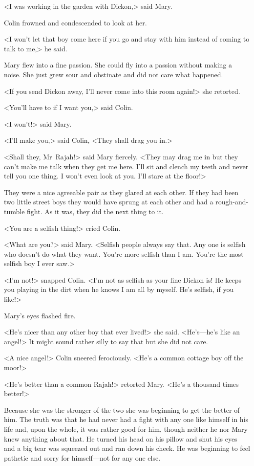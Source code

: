 <I was working in the garden with Dickon,> said Mary.

Colin frowned and condescended to look at her.

<I won't let that boy come here if you go and stay with him instead of coming to talk to me,> he said.

Mary flew into a fine passion. She could fly into a passion without making a noise. She just grew sour and obstinate and did not care what happened.

<If you send Dickon away, I'll never come into this room again!> she retorted.

<You'll have to if I want you,> said Colin.

<I won't!> said Mary.

<I'll make you,> said Colin, <They shall drag you in.>

<Shall they, Mr~Rajah!> said Mary fiercely. <They may drag me in but they can't make me talk when they get me here. I'll sit and clench my teeth and never tell you one thing. I won't even look at you. I'll stare at the floor!>

They were a nice agreeable pair as they glared at each other. If they had been two little street boys they would have sprung at each other and had a rough-and-tumble fight. As it was, they did the next thing to it.

<You are a selfish thing!> cried Colin.

<What are you?> said Mary. <Selfish people always say that. Any one is selfish who doesn't do what they want. You're more selfish than I am. You're the most selfish boy I ever saw.>

<I'm not!> snapped Colin. <I'm not as selfish as your fine Dickon is! He keeps you playing in the dirt when he knows I am all by myself. He's selfish, if you like!>

Mary's eyes flashed fire.

<He's nicer than any other boy that ever lived!> she said. <He's—he's like an angel!> It might sound rather silly to say that but she did not care.

<A nice angel!> Colin sneered ferociously. <He's a common cottage boy off the moor!>

<He's better than a common Rajah!> retorted Mary. <He's a thousand times better!>

Because she was the stronger of the two she was beginning to get the better of him. The truth was that he had never had a fight with any one like himself in his life and, upon the whole, it was rather good for him, though neither he nor Mary knew anything about that. He turned his head on his pillow and shut his eyes and a big tear was squeezed out and ran down his cheek. He was beginning to feel pathetic and sorry for himself—not for any one else.

